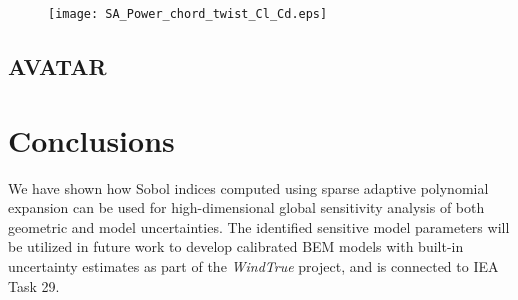 \begin{figure}[h!]
\centering
\texttt{[image: SA\_Power\_chord\_twist\_Cl\_Cd.eps]}
\caption{}
\label{sensitivity_analysis}
\end{figure}

\subsection{AVATAR}

\section{Conclusions}\label{sec:conclusions}
We have shown how Sobol indices computed using sparse adaptive polynomial expansion can be used for high-dimensional global sensitivity analysis of both geometric and model uncertainties. The identified sensitive model parameters will be utilized in future work to develop calibrated BEM models with built-in uncertainty estimates as part of the \textit{WindTrue} project, and is connected to IEA Task 29.